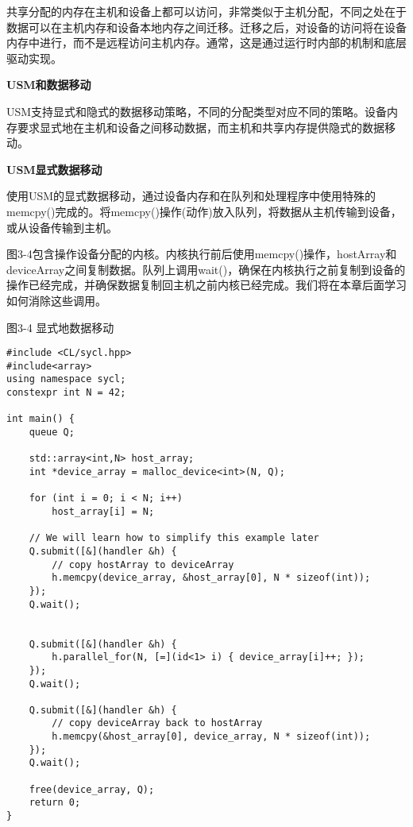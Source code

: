 共享分配的内存在主机和设备上都可以访问，非常类似于主机分配，不同之处在于数据可以在主机内存和设备本地内存之间迁移。迁移之后，对设备的访问将在设备内存中进行，而不是远程访问主机内存。通常，这是通过运行时内部的机制和底层驱动实现。\par

\hspace*{\fill} \par %
\textbf{USM和数据移动}

USM支持显式和隐式的数据移动策略，不同的分配类型对应不同的策略。设备内存要求显式地在主机和设备之间移动数据，而主机和共享内存提供隐式的数据移动。\par

\hspace*{\fill} \par %
\textbf{USM显式数据移动}

使用USM的显式数据移动，通过设备内存和在队列和处理程序中使用特殊的memcpy()完成的。将memcpy()操作(动作)放入队列，将数据从主机传输到设备，或从设备传输到主机。\par

图3-4包含操作设备分配的内核。内核执行前后使用memcpy()操作，hostArray和deviceArray之间复制数据。队列上调用wait()，确保在内核执行之前复制到设备的操作已经完成，并确保数据复制回主机之前内核已经完成。我们将在本章后面学习如何消除这些调用。\par

\hspace*{\fill} \par %
图3-4 显式地数据移动
\begin{lstlisting}[caption={}]
#include <CL/sycl.hpp>
#include<array>
using namespace sycl;
constexpr int N = 42; 

int main() {
	queue Q;
	
	std::array<int,N> host_array;
	int *device_array = malloc_device<int>(N, Q);
	
	for (int i = 0; i < N; i++)
		host_array[i] = N;
		
	// We will learn how to simplify this example later
	Q.submit([&](handler &h) {
		// copy hostArray to deviceArray
		h.memcpy(device_array, &host_array[0], N * sizeof(int));
	});
	Q.wait();
	
	
	Q.submit([&](handler &h) {
		h.parallel_for(N, [=](id<1> i) { device_array[i]++; }); 
	});
	Q.wait();
	
	Q.submit([&](handler &h) {
		// copy deviceArray back to hostArray
		h.memcpy(&host_array[0], device_array, N * sizeof(int)); 
	});
	Q.wait();
	
	free(device_array, Q);
	return 0;
}
\end{lstlisting}

